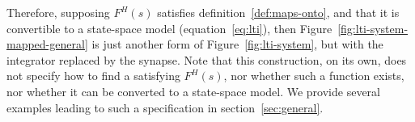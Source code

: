 Therefore, supposing $F^{H}(s)$ satisfies definition~\ref{def:maps-onto}, and that it is convertible to a state-space model (equation~\ref{eq:lti}), then Figure~\ref{fig:lti-system-mapped-general} is just another form of Figure~\ref{fig:lti-system}, but with the integrator replaced by the synapse.
Note that this construction, on its own, does not specify how to find a satisfying $F^{H}(s)$, nor whether such a function exists, nor whether it can be converted to a state-space model.
We provide several examples leading to such a specification in section~\ref{sec:general}.

